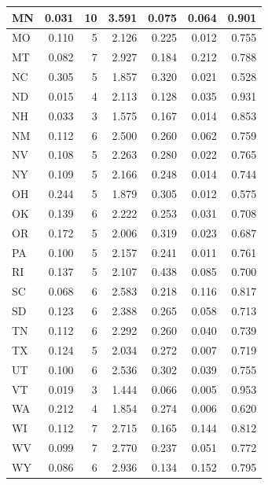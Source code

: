 \documentclass[]{article}
\begin{document}
\begin{table}[!h]
\begin{tabular}{l|r|r|r|r|r|r}
\hline
MN & 0.031 & 10 & 3.591 & 0.075 & 0.064 & 0.901\\
\hline
\rowcolor{gray!6}  MO & 0.110 & 5 & 2.126 & 0.225 & 0.012 & 0.755\\
\hline
MT & 0.082 & 7 & 2.927 & 0.184 & 0.212 & 0.788\\
\hline
\rowcolor{gray!6}  NC & 0.305 & 5 & 1.857 & 0.320 & 0.021 & 0.528\\
\hline
ND & 0.015 & 4 & 2.113 & 0.128 & 0.035 & 0.931\\
\hline
\rowcolor{gray!6}  NH & 0.033 & 3 & 1.575 & 0.167 & 0.014 & 0.853\\
\hline
NM & 0.112 & 6 & 2.500 & 0.260 & 0.062 & 0.759\\
\hline
\rowcolor{gray!6}  NV & 0.108 & 5 & 2.263 & 0.280 & 0.022 & 0.765\\
\hline
NY & 0.109 & 5 & 2.166 & 0.248 & 0.014 & 0.744\\
\hline
\rowcolor{gray!6}  OH & 0.244 & 5 & 1.879 & 0.305 & 0.012 & 0.575\\
\hline
OK & 0.139 & 6 & 2.222 & 0.253 & 0.031 & 0.708\\
\hline
\rowcolor{gray!6}  OR & 0.172 & 5 & 2.006 & 0.319 & 0.023 & 0.687\\
\hline
PA & 0.100 & 5 & 2.157 & 0.241 & 0.011 & 0.761\\
\hline
\rowcolor{gray!6}  RI & 0.137 & 5 & 2.107 & 0.438 & 0.085 & 0.700\\
\hline
SC & 0.068 & 6 & 2.583 & 0.218 & 0.116 & 0.817\\
\hline
\rowcolor{gray!6}  SD & 0.123 & 6 & 2.388 & 0.265 & 0.058 & 0.713\\
\hline
TN & 0.112 & 6 & 2.292 & 0.260 & 0.040 & 0.739\\
\hline
\rowcolor{gray!6}  TX & 0.124 & 5 & 2.034 & 0.272 & 0.007 & 0.719\\
\hline
UT & 0.100 & 6 & 2.536 & 0.302 & 0.039 & 0.755\\
\hline
\rowcolor{gray!6}  VT & 0.019 & 3 & 1.444 & 0.066 & 0.005 & 0.953\\
\hline
WA & 0.212 & 4 & 1.854 & 0.274 & 0.006 & 0.620\\
\hline
\rowcolor{gray!6}  WI & 0.112 & 7 & 2.715 & 0.165 & 0.144 & 0.812\\
\hline
WV & 0.099 & 7 & 2.770 & 0.237 & 0.051 & 0.772\\
\hline
\rowcolor{gray!6}  WY & 0.086 & 6 & 2.936 & 0.134 & 0.152 & 0.795\\
\hline
\end{tabular}
\end{table}
\end{document}
